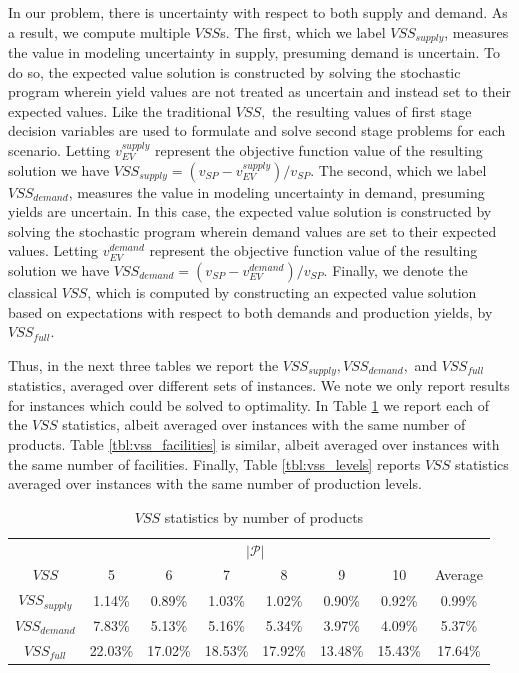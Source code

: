 \documentclass[12pt]{article}
\theoremstyle{thmstylethree}%
\begin{document}
In our problem, there is uncertainty with respect to both supply and demand. As a result, we compute multiple $VSS$s. The first, which we label $VSS_{supply}$, measures the value in modeling uncertainty in supply, presuming demand is uncertain. To do so, the expected value solution is constructed by solving the stochastic program wherein yield values are not treated as uncertain and instead set to their expected values. Like the traditional $VSS,$ the resulting values of first stage decision variables are used to formulate and solve second stage problems for each scenario. Letting $v_{EV}^{supply}$ represent the objective function value of the resulting solution we have $VSS_{supply} = (v_{SP} - v_{EV}^{supply})/v_{SP}.$ The second, which we label $VSS_{demand}$, measures the value in modeling uncertainty in demand, presuming yields are uncertain. In this case, the expected value solution is constructed by solving the stochastic program wherein demand values are set to their expected values. Letting $v_{EV}^{demand}$ represent the objective function value of the resulting solution we have $VSS_{demand} = (v_{SP} - v_{EV}^{demand})/v_{SP}.$ Finally, we denote the classical $VSS$, which is computed by constructing an expected value solution based on expectations with respect to both demands and production yields, by $VSS_{full}.$ 

Thus, in the next three tables we report the $VSS_{supply}, VSS_{demand}, $ and $VSS_{full}$ statistics, averaged over different sets of instances. We note we only report results for instances which could be solved to optimality. In Table \ref{tbl:vss_products} we report each of the $VSS$ statistics, albeit averaged over instances with the same number of products. Table \ref{tbl:vss_facilities} is similar, albeit averaged over instances with the same number of facilities. Finally, Table \ref{tbl:vss_levels} reports $VSS$ statistics averaged over instances with the same number of production levels. 

\begin{table}[htp]
\center
\small
\begin{tabular}{|c|c|c|c|c|c|c|c|}
\hline
& \multicolumn{6}{c}{$\vert \mathcal{P} \vert$} & \\
$VSS$ & 5 & 6 & 7 & 8 & 9 & 10 & Average \\
\hline
$VSS_{supply}$ & 1.14\% & 0.89\% & 1.03\% & 1.02\% & 0.90\% & 0.92\% & 0.99\% \\
$VSS_{demand}$ & 7.83\% & 5.13\% & 5.16\% & 5.34\% & 3.97\% & 4.09\% & 5.37\% \\
$VSS_{full}$ & 22.03\% & 17.02\% & 18.53\% & 17.92\% & 13.48\% & 15.43\% & 17.64\% \\
\hline
\end{tabular}
\caption{$VSS$ statistics by number of products}
\label{tbl:vss_products}
\end{table}
\end{document}
